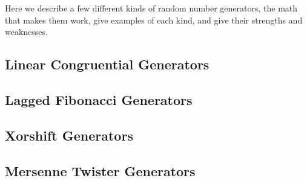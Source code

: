 Here we describe a few different kinds of random number generators, the math that makes them work, give examples of each kind, and give their strengths and weaknesses.

\subsection{Linear Congruential Generators}
\label{sec:lcg}


\subsection{Lagged Fibonacci Generators}
\label{sec:laggedfib}


\subsection{Xorshift Generators}
\label{sec:xorshift}


\subsection{Mersenne Twister Generators}
\label{sec:mt}

